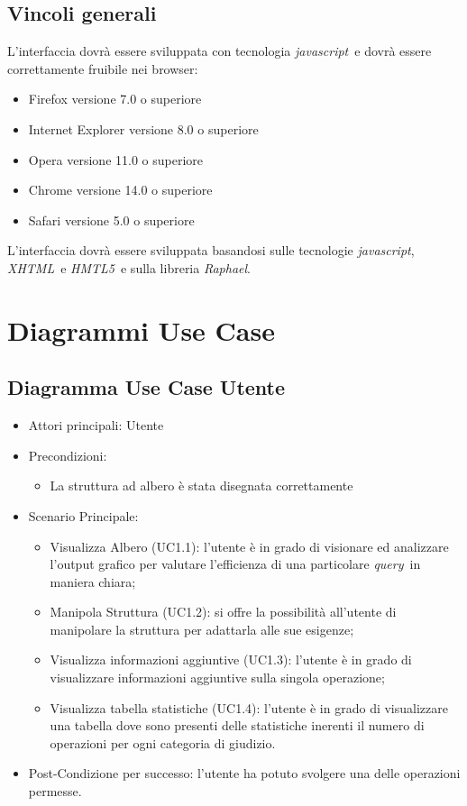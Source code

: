 \subsection{Vincoli generali}
L'interfaccia dovrà essere sviluppata con tecnologia \textit{javascript}\ e dovrà essere correttamente fruibile nei browser:
\begin{itemize}
\item Firefox versione 7.0 o superiore
\item Internet Explorer versione 8.0 o superiore
\item Opera versione 11.0 o superiore
\item Chrome versione 14.0 o superiore
\item Safari versione 5.0 o superiore
\end{itemize}
L'interfaccia dovrà essere sviluppata basandosi sulle tecnologie \textit{javascript}, \textit{XHTML}\ e \textit{HMTL5}\ e sulla libreria \textit{Raphael}.
\newpage
\section{Diagrammi Use Case}
\subsection{Diagramma Use Case Utente}
\begin{itemize}
\item Attori principali: Utente
\item Precondizioni:
\begin{itemize}
\item La struttura ad albero è stata disegnata correttamente
\end{itemize}
\item Scenario Principale:
\begin{itemize}
\item Visualizza Albero (UC1.1): l'utente è in grado di visionare ed analizzare l'output grafico per valutare l'efficienza di una particolare \textit{query}\ in maniera chiara;
\item Manipola Struttura (UC1.2): si offre la possibilità all'utente di manipolare la struttura per adattarla alle sue esigenze;
\item Visualizza informazioni aggiuntive (UC1.3): l'utente è in grado di visualizzare informazioni aggiuntive sulla singola operazione;
\item Visualizza tabella statistiche (UC1.4): l'utente è in grado di visualizzare una tabella dove sono presenti delle statistiche inerenti il numero di operazioni per ogni categoria di giudizio.
\end{itemize}
\item Post-Condizione per successo: l'utente ha potuto svolgere una delle operazioni permesse.
\end{itemize}
